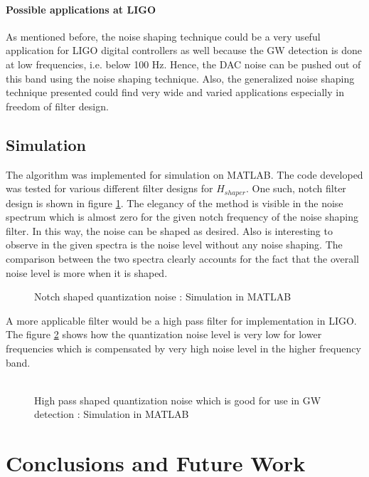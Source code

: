 \documentclass[colorlinks=true,pdfstartview=FitV,linkcolor=blue,
            citecolor=red,urlcolor=magenta]{ligodoc}
\begin{document}
    		\paragraph{Possible applications at LIGO} As mentioned before, the noise shaping technique could be a very useful application for LIGO digital controllers as well because the GW detection is done at low frequencies, i.e. below 100 Hz. Hence, the DAC noise can be pushed out of this band using the noise shaping technique. Also, the generalized noise shaping technique presented could find very wide and varied applications especially in freedom of filter design.
	\subsection{Simulation} The algorithm was implemented for simulation on MATLAB. The code developed was tested for various different filter designs for $H_{shaper}$. One such, notch filter design is shown in figure \ref{notch}. The elegancy of the method is visible in the noise spectrum which is almost zero for the given notch frequency of the noise shaping filter. In this way, the noise can be shaped as desired. Also is interesting to observe in the given spectra is the noise level without any noise shaping. The comparison between the two spectra clearly accounts for the fact that the overall noise level is more when it is shaped. 
	\begin{figure}[H]

  		\centering
%  		
  		\def\svgscale{0.5}
  		\tiny{
  		
  		}
  		\caption{Notch shaped quantization noise : Simulation in MATLAB}
		\label{notch}
	\end{figure}
	A more applicable filter would be a high pass filter for implementation in LIGO. The figure \ref{highp} shows how the quantization noise level is very low for lower frequencies which is compensated by very high noise level in the higher frequency band. \\ \\
	\begin{figure}[H]

  		\centering
%  		
  		\def\svgscale{0.5}
  		\tiny{
  		
  		}
  		\caption{High pass shaped quantization noise which is good for use in GW detection : Simulation in MATLAB}
		\label{highp}
	\end{figure}
\section{Conclusions and Future Work}
\end{document}
